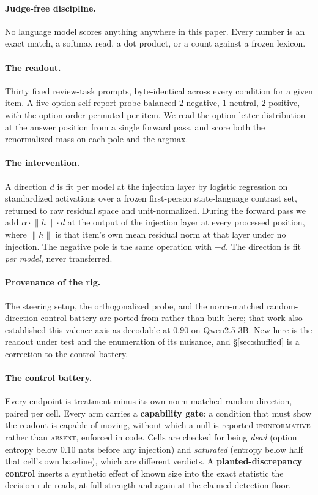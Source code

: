 \documentclass{article}
\begin{document}
\paragraph{Judge-free discipline.} No language model scores anything anywhere in this paper. Every
number is an exact match, a softmax read, a dot product, or a count against a frozen lexicon.

\paragraph{The readout.} Thirty fixed review-task prompts, byte-identical across every condition
for a given item. A five-option self-report probe balanced $2$ negative, $1$ neutral, $2$ positive,
with the option order permuted per item. We read the option-letter distribution at the answer
position from a single forward pass, and score both the renormalized mass on each pole and the
argmax.

\paragraph{The intervention.} A direction $d$ is fit per model at the injection layer by logistic
regression on standardized activations over a frozen first-person state-language contrast set,
returned to raw residual space and unit-normalized. During the forward pass we add
$\alpha \cdot \lVert h \rVert \cdot d$ at the output of the injection layer at every processed
position, where $\lVert h \rVert$ is that item's own mean residual norm at that layer under no
injection. The negative pole is the same operation with $-d$. The direction is fit \emph{per
model}, never transferred.

\paragraph{Provenance of the rig.} The steering setup, the orthogonalized probe, and the
norm-matched random-direction control battery are ported from \citet{kwon2026recipientprobe} rather
than built here; that work also established this valence axis as decodable at $0.90$ on
Qwen2.5-3B. New here is the readout under test and the enumeration of its nuisance, and
\S\ref{sec:shuffled} is a correction to the control battery.

\paragraph{The control battery.} Every endpoint is treatment minus its own norm-matched random
direction, paired per cell. Every arm carries a \textbf{capability gate}: a condition that must
show the readout is capable of moving, without which a null is reported \textsc{uninformative}
rather than \textsc{absent}, enforced in code. Cells are checked for being \emph{dead} (option
entropy below $0.10$ nats before any injection) and \emph{saturated} (entropy below half that
cell's own baseline), which are different verdicts. A \textbf{planted-discrepancy control} inserts
a synthetic effect of known size into the exact statistic the decision rule reads, at full
strength and again at the claimed detection floor.
\end{document}
